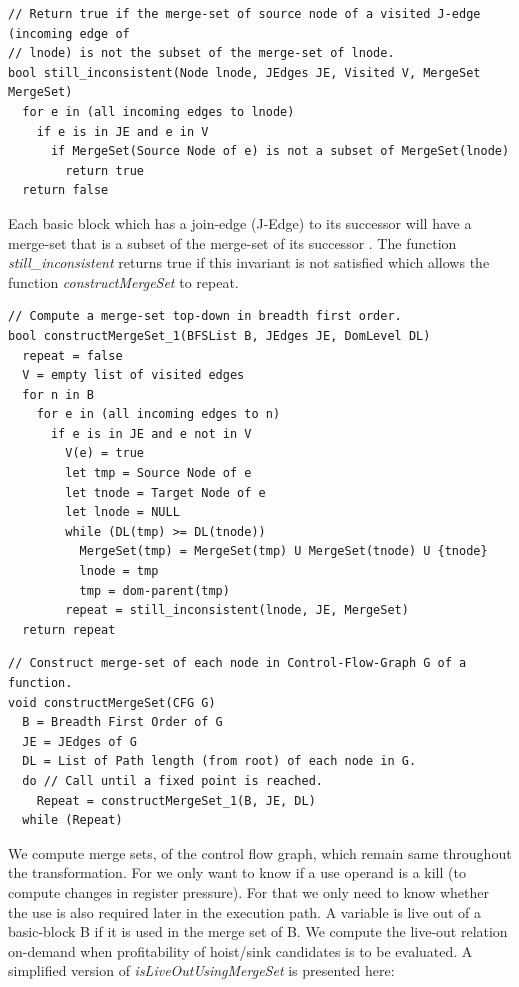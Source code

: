 \documentclass[acmlarge,review,anonymous]{acmart}\settopmatter{printfolios=true}
\begin{document}
\begin{verbatim}
// Return true if the merge-set of source node of a visited J-edge (incoming edge of
// lnode) is not the subset of the merge-set of lnode.
bool still_inconsistent(Node lnode, JEdges JE, Visited V, MergeSet MergeSet)
  for e in (all incoming edges to lnode)
    if e is in JE and e in V
      if MergeSet(Source Node of e) is not a subset of MergeSet(lnode)
        return true
  return false
\end{verbatim}

Each basic block which has a join-edge (J-Edge) to its successor will have a
merge-set that is a subset of the merge-set of its successor \cite{das2005}. The
function \emph{still\_inconsistent} returns true if this invariant is not
satisfied which allows the function \emph{constructMergeSet} to repeat.


\begin{verbatim}
// Compute a merge-set top-down in breadth first order.
bool constructMergeSet_1(BFSList B, JEdges JE, DomLevel DL)
  repeat = false
  V = empty list of visited edges
  for n in B
    for e in (all incoming edges to n)
      if e is in JE and e not in V
        V(e) = true
        let tmp = Source Node of e
        let tnode = Target Node of e
        let lnode = NULL
        while (DL(tmp) >= DL(tnode))
          MergeSet(tmp) = MergeSet(tmp) U MergeSet(tnode) U {tnode}
          lnode = tmp
          tmp = dom-parent(tmp)
        repeat = still_inconsistent(lnode, JE, MergeSet)
  return repeat
\end{verbatim}
\newpage
\begin{verbatim}
// Construct merge-set of each node in Control-Flow-Graph G of a function.
void constructMergeSet(CFG G)
  B = Breadth First Order of G
  JE = JEdges of G
  DL = List of Path length (from root) of each node in G.
  do // Call until a fixed point is reached.
    Repeat = constructMergeSet_1(B, JE, DL)
  while (Repeat)
\end{verbatim}

We compute merge sets, of the control flow graph, which remain same throughout
the \GCM{} transformation. For \GCM{} we only want to know if a use operand is a
kill (to compute changes in register pressure). For that we only need to know
whether the use is also required later in the execution path. A variable is live
out of a basic-block B if it is used in the merge set of B. We compute the
live-out relation on-demand when profitability of hoist/sink candidates is to be
evaluated. A simplified version of \emph{isLiveOutUsingMergeSet} is presented
here:
\end{document}
